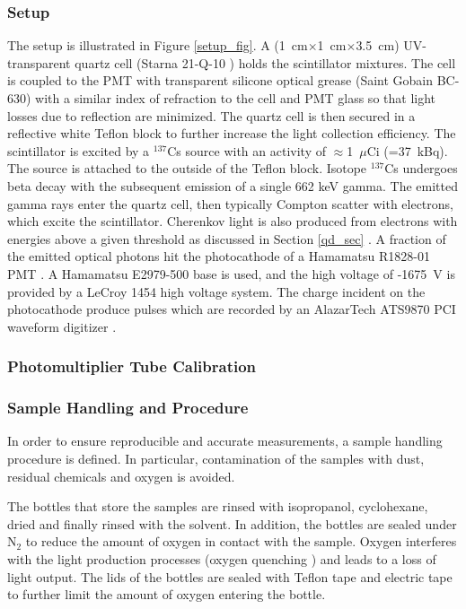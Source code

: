 \documentclass{JINST}
\begin{document}
\subsubsection{Setup}
The setup is illustrated in Figure \ref{setup_fig}. A (1~cm$\times$1~cm$\times$3.5~cm) UV-transparent quartz cell (Starna 21-Q-10 \cite{starnacells}) holds the scintillator mixtures. The cell is coupled to the PMT with transparent silicone optical grease (Saint Gobain BC-630) with a similar index of refraction to the cell and PMT glass so that light losses due to reflection are minimized. The quartz cell is then secured in a reflective white Teflon block to further increase the light collection efficiency. The scintillator is excited by a ${^{137}}$Cs source with an activity of $\approx$1~$\mu$Ci (=37~kBq). The source is attached to the outside of the Teflon block. Isotope ${^{137}}$Cs undergoes beta decay with the subsequent emission of a single 662 keV gamma. The emitted gamma rays enter the quartz cell, then typically Compton scatter with electrons, which excite the scintillator. Cherenkov light is also produced from electrons with energies above a given threshold as discussed in Section  \ref{qd_sec} . A fraction of the emitted optical photons hit the photocathode of a Hamamatsu R1828-01 PMT \cite{hamamatsupmt}. A Hamamatsu E2979-500 base \cite{hamamatsubase} is used, and the high voltage of -1675~V is provided by a LeCroy 1454 high voltage system. The charge incident on the photocathode produce pulses which are recorded by an AlazarTech ATS9870 PCI waveform digitizer \cite{alazartech}. 

\subsubsection{Photomultiplier Tube Calibration}

\subsubsection{Sample Handling and Procedure}
In order to ensure reproducible and accurate measurements, a sample handling procedure is defined. In particular, contamination of the samples with dust, residual chemicals and oxygen is avoided.  

The bottles that store the samples are rinsed with isopropanol, cyclohexane, dried and finally rinsed with the solvent. In addition, the bottles are sealed under N$_{2}$ to reduce the amount of oxygen in contact with the sample. Oxygen interferes with the light production processes (oxygen quenching \cite{birks64}) and leads to a loss of light output. The lids of the bottles are sealed with Teflon tape and electric tape to further limit the amount of oxygen entering the bottle. 
\end{document}
